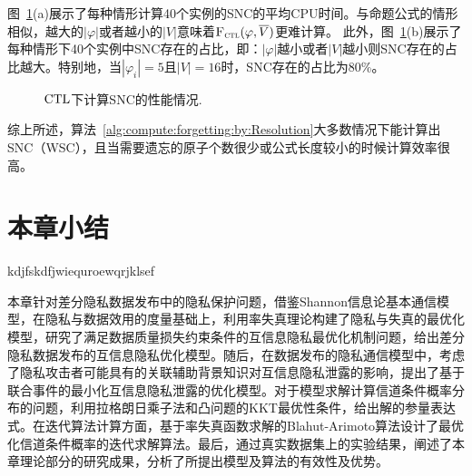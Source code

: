 图~\ref{chapter04:fig:CtlTime}(a)展示了每种情形计算40个实例的SNC的平均CPU时间。与命题公式的情形相似，越大的$|\varphi|$或者越小的$|V|$意味着${\textsc{F}_{\textsc{ctl}}}(\varphi, \overline{V})$更难计算。
此外，图~\ref{chapter04:fig:CtlTime}(b)展示了每种情形下40个实例中SNC存在的占比，即：$|\varphi|$越小或者$|V|$越小则SNC存在的占比越大。特别地，当$|\varphi_i|=5$且$|V|=16$时，SNC存在的占比为80\%。



\begin{figure*}[!htb]
	\centering
	\caption{$\textrm{CTL}$下计算SNC的性能情况.}
	\label{chapter04:fig:CtlTime}
\end{figure*}

综上所述，算法~\ref{alg:compute:forgetting:by:Resolution}大多数情况下能计算出SNC（WSC），且当需要遗忘的原子个数很少或公式长度较小的时候计算效率很高。

\section{本章小结}\label{chapter04-conclusion}
kdjfskdfjwiequroewqrjklsef

本章针对差分隐私数据发布中的隐私保护问题，借鉴Shannon信息论基本通信模型，在隐私与数据效用的度量基础上，利用率失真理论构建了隐私与失真的最优化模型，研究了满足数据质量损失约束条件的互信息隐私最优化机制问题，给出差分隐私数据发布的互信息隐私优化模型。随后，在数据发布的隐私通信模型中，考虑了隐私攻击者可能具有的关联辅助背景知识对互信息隐私泄露的影响，提出了基于联合事件的最小化互信息隐私泄露的优化模型。对于模型求解计算信道条件概率分布的问题，利用拉格朗日乘子法和凸问题的KKT最优性条件，给出解的参量表达式。在迭代算法计算方面，基于率失真函数求解的Blahut-Arimoto算法设计了最优化信道条件概率的迭代求解算法。最后，通过真实数据集上的实验结果，阐述了本章理论部分的研究成果，分析了所提出模型及算法的有效性及优势。

